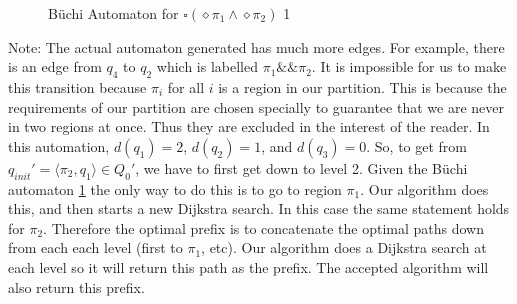 \begin{figure}
\centering
{}
\caption{B\"uchi Automaton for $\square(\diamond \pi_1 \land \diamond \pi_2 )$ 1}
\label{fig:gasBuchiRec}
\end{figure}
Note: The actual automaton generated has much more edges. For example, there is an edge from $q_4$ to $q_2$ which is labelled $\pi_1 \&\& \pi_2$. It is impossible for us to make this transition because $\pi_i$ for all $i$ is a region in our partition. This is because the requirements of our partition are chosen specially to guarantee that we are never in two regions at once. Thus they are excluded in the interest of the reader. In this automation, $d(q_1)=2$, $d(q_2)=1$, and $d(q_3)=0$. So, to get from $q_{init}' = \langle \pi_2, q_1 \rangle \in Q_0'$, we have to first get down to level 2. Given the B\"{u}chi automaton \ref{fig:gasBuchiRec} the only way to do this is to go to region $\pi_1$. Our algorithm does this, and then starts a new Dijkstra search. In this case the same statement holds for $\pi_2$. Therefore the optimal prefix is to concatenate the optimal paths down from each each level (first to $\pi_1$, etc). Our algorithm does a Dijkstra search at each level so it will return this path as the prefix. The accepted algorithm will also return this prefix. 

